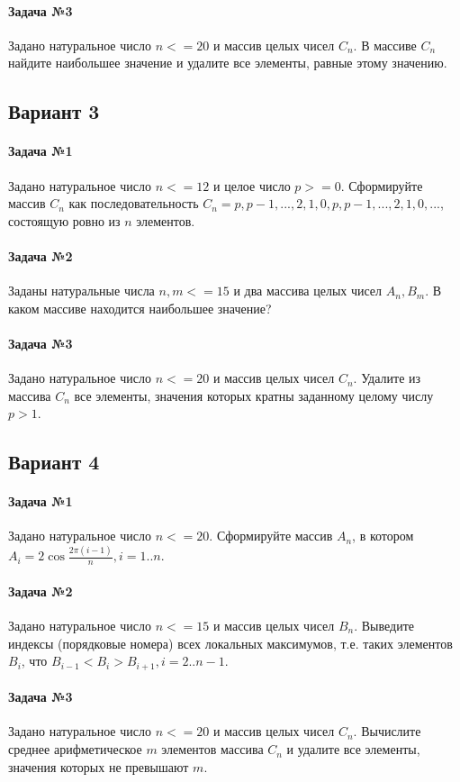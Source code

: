 \documentclass[12pt,a4paper]{report}
\begin{document}
\paragraph*{Задача №3}
Задано натуральное число $n <= 20$ и массив целых чисел $C_n$. В массиве $C_n$ найдите наибольшее значение и удалите все элементы, равные этому значению.


\subsection*{Вариант 3}
\paragraph*{Задача №1}
Задано натуральное число $n <= 12$ и целое число $p >= 0$. Сформируйте массив $C_n$ как последовательность $C_n = p, p-1, ..., 2, 1, 0, p, p-1, ..., 2, 1, 0, ...$, состоящую ровно из $n$ элементов.
\paragraph*{Задача №2}
Заданы натуральные числа $n, m <= 15$ и два массива целых чисел $A_n, B_m$. В каком массиве находится наибольшее значение?
\paragraph*{Задача №3}
Задано натуральное число $n <= 20$ и массив целых чисел $C_n$. Удалите из массива $C_n$ все элементы, значения которых кратны заданному целому числу $p > 1$.


\subsection*{Вариант 4}
\paragraph*{Задача №1}
Задано натуральное число $n <= 20$. Сформируйте массив $A_n$, в котором $A_i = 2 \cos { \frac {2 \pi (i - 1)} {n} }, i = 1..n$.
\paragraph*{Задача №2}
Задано натуральное число $n <= 15$ и массив целых чисел $B_n$. Выведите индексы (порядковые номера) всех локальных максимумов, т.е. таких элементов $B_i$, что $B_{i-1} < B_{i} > B_{i+1}, i=2..n-1$.
\paragraph*{Задача №3}
Задано натуральное число $n <= 20$ и массив целых чисел $C_n$. Вычислите среднее арифметическое $m$ элементов массива $C_n$ и удалите все элементы, значения которых не превышают $m$.
\end{document}
